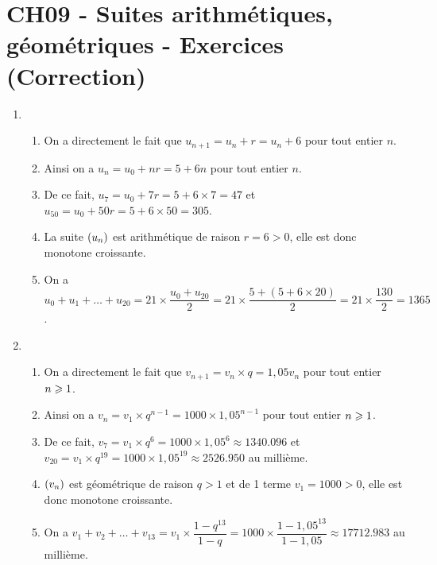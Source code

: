 \documentclass[a4paper,11pt]{article}
\author{Pierquet}
\title{\nomfichier}
\begin{document}
\pagestyle{fancy}

\part{CH09 - Suites arithmétiques, géométriques - Exercices (Correction)}

\medskip


\begin{enumerate}
	\item 
	\begin{enumerate}
		\item On a directement le fait que $u_{n+1}=u_n + r = u_n + 6$ pour tout entier $n$.
		\item Ainsi on a $u_n = u_0 + nr = 5 + 6n$ pour tout entier $n$.
		\item De ce fait, $u_7=u_0+7r=5+6\times7=47$ et $u_{50}=u_0+50r=5+6\times50=305$.
		\item La suite $\suiten$ est arithmétique de raison $r=6>0$, elle est donc monotone croissante.
		\item On a $u_0 + u_1 + \ldots + u_{20} = 21 \times \dfrac{u_0+u_{20}}{2}=21 \times \dfrac{5 + (5 + 6 \times 20)}{2} = 21 \times \dfrac{130}{2}=\num{1365}$.
	\end{enumerate}
	\item 
	\begin{enumerate}
		\item On a directement le fait que $v_{n+1}=v_n \times q = 1,05v_n$ pour tout entier $n \pg 1$.
		\item Ainsi on a $v_n = v_1 \times q^{n-1} = \num{1000} \times 1,05^{n-1}$ pour tout entier $n \pg 1$.
		\item De ce fait, $v_7=v_1 \times q^6 = \num{1000} \times 1,05^6 \approx \num{1340,096}$ et $v_{20}=v_1 \times q^{19} = \num{1000} \times 1,05^{19} \approx \num{2526,950}$ au millième.
		\item $\suiten[v]$ est géométrique de raison $q > 1$ et de 1 terme $v_1 = \num{1000} > 0$, elle est donc monotone croissante.
		\item On a $v_1 + v_2 + \ldots + v_{13} = v_1 \times \dfrac{1-q^{13}}{1-q}=\num{1000} \times \dfrac{1-1,05^{13}}{1-1,05} \approx \num{17712,983}$ au millième.
	\end{enumerate} 
\end{enumerate}

\smallskip

\end{document}
